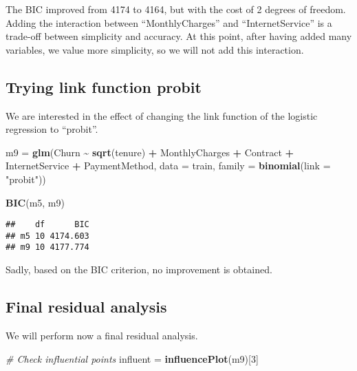 \documentclass[
]{article}
\newenvironment{Shaded}{\begin{snugshade}}{\end{snugshade}}
\newcommand{\AttributeTok}[1]{\textcolor[rgb]{0.13,0.29,0.53}{#1}}
\newcommand{\CommentTok}[1]{\textcolor[rgb]{0.56,0.35,0.01}{\textit{#1}}}
\newcommand{\DecValTok}[1]{\textcolor[rgb]{0.00,0.00,0.81}{#1}}
\newcommand{\FunctionTok}[1]{\textcolor[rgb]{0.13,0.29,0.53}{\textbf{#1}}}
\newcommand{\NormalTok}[1]{#1}
\newcommand{\OtherTok}[1]{\textcolor[rgb]{0.56,0.35,0.01}{#1}}
\newcommand{\SpecialCharTok}[1]{\textcolor[rgb]{0.81,0.36,0.00}{\textbf{#1}}}
\newcommand{\StringTok}[1]{\textcolor[rgb]{0.31,0.60,0.02}{#1}}
\begin{document}
The BIC improved from 4174 to 4164, but with the cost of 2 degrees of
freedom. Adding the interaction between ``MonthlyCharges'' and
``InternetService'' is a trade-off between simplicity and accuracy. At
this point, after having added many variables, we value more simplicity,
so we will not add this interaction.

\hypertarget{trying-link-function-probit}{%
\subsection{Trying link function
probit}\label{trying-link-function-probit}}

We are interested in the effect of changing the link function of the
logistic regression to ``probit''.

\begin{Shaded}
\begin{Highlighting}[]
\NormalTok{m9 }\OtherTok{=} \FunctionTok{glm}\NormalTok{(Churn }\SpecialCharTok{\textasciitilde{}} \FunctionTok{sqrt}\NormalTok{(tenure) }\SpecialCharTok{+}\NormalTok{ MonthlyCharges }\SpecialCharTok{+}\NormalTok{ Contract }\SpecialCharTok{+}\NormalTok{ InternetService }\SpecialCharTok{+}
\NormalTok{    PaymentMethod, }\AttributeTok{data =}\NormalTok{ train, }\AttributeTok{family =} \FunctionTok{binomial}\NormalTok{(}\AttributeTok{link =} \StringTok{"probit"}\NormalTok{))}

\FunctionTok{BIC}\NormalTok{(m5, m9)}
\end{Highlighting}
\end{Shaded}

\begin{verbatim}
##    df      BIC
## m5 10 4174.603
## m9 10 4177.774
\end{verbatim}

Sadly, based on the BIC criterion, no improvement is obtained.

\hypertarget{final-residual-analysis}{%
\subsection{Final residual analysis}\label{final-residual-analysis}}

We will perform now a final residual analysis.

\begin{Shaded}
\begin{Highlighting}[]
\CommentTok{\# Check influential points}
\NormalTok{influent }\OtherTok{=} \FunctionTok{influencePlot}\NormalTok{(m9)[}\DecValTok{3}\NormalTok{]}
\end{Highlighting}
\end{Shaded}
\end{document}
